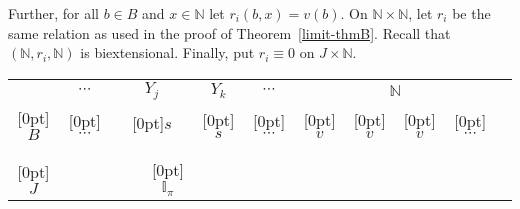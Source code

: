 \documentclass{LMCS}
\begin{document}
Further, for all $b \in B$ and $x \in \mathbb{N}$ let $r_i(b,x) =
v(b)$. On $\mathbb{N} \times \mathbb{N}$, let $r_i$ be the same
relation as used in the proof of Theorem~\ref{limit-thmB}. Recall that
$(\mathbb{N}, r_i, \mathbb{N})$ is biextensional. Finally, put $r_i
\equiv 0$ on $J \times \mathbb{N}$. 



\begin{center}
\begin{tabular}{c ccc  ccc ccc cc  ccccc}
& \multicolumn{3}{c}{$\cdots$} &  \multicolumn{3}{c}{$Y_j$}  &  \multicolumn{3}{c}{$Y_k$}
                                       &  \multicolumn{2}{c}{$\cdots$}
                                       & \multicolumn{4}{c}{$\mathbb{N}$}
\\ \cline{2-16}
\raisebox{-1.5ex}[0pt]{$B$} &  \multicolumn{3}{|c|}{\raisebox{-1.5ex}[0pt]{$\cdots$}}
     & \multicolumn{3}{|c|}{\raisebox{-1.5ex}[0pt]{$s$}} & \multicolumn{3}{|c|}{\raisebox{-1.5ex}[0pt]{$s$}}
                                &  \multicolumn{2}{c}{\raisebox{-1.5ex}[0pt]{$\cdots$}}
                                      &   \multicolumn{1}{|c|}{\raisebox{-1.5ex}[0pt]{$v$}}
                                         &   \multicolumn{1}{|c|}{\raisebox{-1.5ex}[0pt]{$v$}}
                                            &   \multicolumn{1}{|c|}{\raisebox{-1.5ex}[0pt]{$v$}}
                                            & \multicolumn{1}{|c|}{\raisebox{-1.5ex}[0pt]{$\cdots$}} \\  & \multicolumn{1}{|c}{} &    \multicolumn{1}{c}{} & \multicolumn{1}{c|}{}   &  \multicolumn{1}{|c}{} &    \multicolumn{1}{c}{} & \multicolumn{1}{c|}{}     &  \multicolumn{1}{|c}{} &    \multicolumn{1}{c}{} & \multicolumn{1}{c|}{}     &  \multicolumn{1}{c}{}  &  \multicolumn{1}{c}{} &                    \multicolumn{1}{|c|}{} & \multicolumn{1}{|c|}{}  & \multicolumn{1}{|c|}{} & \multicolumn{1}{c|}{} \\  \cline{2-16}
     & \multicolumn{1}{|c}{} &    \multicolumn{1}{c}{} & \multicolumn{1}{c}{}      &  \multicolumn{1}{c}{} &    \multicolumn{1}{c}{} & \multicolumn{1}{c}{}      &  \multicolumn{1}{c}{} &    \multicolumn{1}{c}{} & \multicolumn{1}{c}{}     &  \multicolumn{1}{c}{}  &  \multicolumn{1}{c|}{} &                    \multicolumn{1}{c}{} & \multicolumn{1}{c}{}  & \multicolumn{1}{c}{} & \multicolumn{1}{c|}{} \\  \raisebox{-8ex}[0pt]{$J$}           & \multicolumn{1}{|c}{} &    \multicolumn{1}{c}{} & \multicolumn{1}{c}{}      &  \multicolumn{1}{c}{} &    \multicolumn{1}{c}{} & \multicolumn{1}{c}{\raisebox{-12.5ex}[0pt]{$\mathbb{I}_{\pi}$}}      &  \multicolumn{1}{c}{} &    \multicolumn{1}{c}{} & \multicolumn{1}{c}{}     &  \multicolumn{1}{c}{}  &  \multicolumn{1}{c|}{}     &  \multicolumn{1}{c}{}

\end{tabular}
\end{center}
\end{document}
